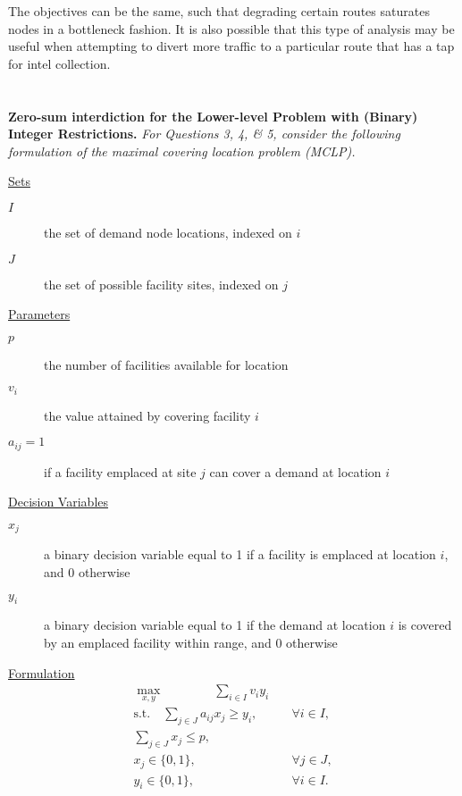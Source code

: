 \documentclass[12pt]{amsart}
\begin{document}
	The objectives can be the same, such that degrading certain routes saturates nodes in a bottleneck fashion.
	It is also possible that this type of analysis may be useful when attempting to divert more traffic to a particular
	route that has a tap for intel collection.


\section{}
\setcounter{subsection}{2}

\textbf{Zero-sum interdiction for the Lower-level Problem with (Binary) Integer Restrictions.} 
\textit{For Questions 3, 4, \& 5, consider the following formulation of the maximal covering 
location problem (MCLP).} \\

\begin{center}
\begin{minipage}{0.75\linewidth}
	
	\underline{Sets}
		\begin{description}
			\item[$I$] the set of demand node locations, indexed on $i$
			\item[$J$] the set of possible facility sites, indexed on $j$
		\end{description}
		
	\underline{Parameters}
		\begin{description}
			\item[$p$]  the number of facilities available for location
			\item[$v_i$] the value attained by covering facility $i$
			\item[$a_{ij}= 1$] if a facility emplaced at site $j$ can cover a demand at location $i$
		\end{description}
		
	\underline{Decision Variables}
		\begin{description}
			\item[$x_j$] a binary decision variable equal to 1 if a facility is emplaced at location $i$, and 0 otherwise
			\item[$y_i$] a binary decision variable equal to 1 if the demand at location $i$ is covered by an emplaced
			facility within range, and 0 otherwise
		\end{description}
		
	\underline{Formulation}
		\begin{align*}
			\max_{x,y} \qquad\qquad \sum_{i\in I} v_iy_i& \\
			\text{s.t.}\quad \sum_{j\in J} a_{ij}x_j \geq y_i,& \quad \forall i\in I, \\
			\sum_{j\in J} x_j \leq p,& \\
			x_j \in \{0,1\},& \quad \forall j\in J, \\
			y_i \in \{0,1\},& \quad \forall i\in I. \\
		\end{align*}
	

\end{minipage}
\end{center}
\end{document}
